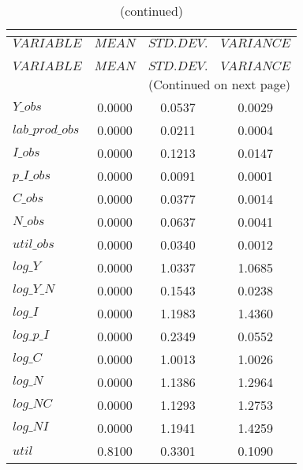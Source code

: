  
\begin{center}
\begin{longtable}{lccc} 
\caption{THEORETICAL MOMENTS}\\
 \label{Table:th_moments}\\
\toprule 
$VARIABLE        $	 & 	 $         MEAN$	 & 	 $    STD. DEV.$	 & 	 $     VARIANCE$\\
\midrule \endfirsthead 
\caption{(continued)}\\
 \toprule \\ 
$VARIABLE        $	 & 	 $         MEAN$	 & 	 $    STD. DEV.$	 & 	 $     VARIANCE$\\
\midrule \endhead 
\midrule \multicolumn{4}{r}{(Continued on next page)} \\ \bottomrule \endfoot 
\bottomrule \endlastfoot 
$Y\_obs          $	 & 	       0.0000	 & 	       0.0537	 & 	       0.0029 \\ 
$lab\_prod\_obs  $	 & 	       0.0000	 & 	       0.0211	 & 	       0.0004 \\ 
$I\_obs          $	 & 	       0.0000	 & 	       0.1213	 & 	       0.0147 \\ 
$p\_I\_obs       $	 & 	       0.0000	 & 	       0.0091	 & 	       0.0001 \\ 
$C\_obs          $	 & 	       0.0000	 & 	       0.0377	 & 	       0.0014 \\ 
$N\_obs          $	 & 	       0.0000	 & 	       0.0637	 & 	       0.0041 \\ 
$util\_obs       $	 & 	       0.0000	 & 	       0.0340	 & 	       0.0012 \\ 
$log\_Y          $	 & 	       0.0000	 & 	       1.0337	 & 	       1.0685 \\ 
$log\_Y\_N       $	 & 	       0.0000	 & 	       0.1543	 & 	       0.0238 \\ 
$log\_I          $	 & 	       0.0000	 & 	       1.1983	 & 	       1.4360 \\ 
$log\_p\_I       $	 & 	       0.0000	 & 	       0.2349	 & 	       0.0552 \\ 
$log\_C          $	 & 	       0.0000	 & 	       1.0013	 & 	       1.0026 \\ 
$log\_N          $	 & 	       0.0000	 & 	       1.1386	 & 	       1.2964 \\ 
$log\_NC         $	 & 	       0.0000	 & 	       1.1293	 & 	       1.2753 \\ 
$log\_NI         $	 & 	       0.0000	 & 	       1.1941	 & 	       1.4259 \\ 
${util}          $	 & 	       0.8100	 & 	       0.3301	 & 	       0.1090 \\ 
\end{longtable}
 \end{center}
